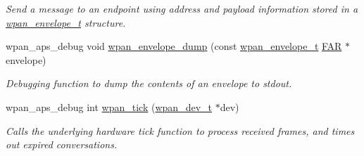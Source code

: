 \begin{DoxyCompactItemize}
\begin{DoxyCompactList}\small\item\em Send a message to an endpoint using address and payload information stored in a \hyperlink{structwpan__envelope__t}{wpan\+\_\+envelope\+\_\+t} structure. \end{DoxyCompactList}\item 
wpan\+\_\+aps\+\_\+debug void \hyperlink{group__wpan__aps_ga2a4e8b3e2022e55e6607243a5feb25cd}{wpan\+\_\+envelope\+\_\+dump} (const \hyperlink{structwpan__envelope__t}{wpan\+\_\+envelope\+\_\+t} \hyperlink{group__hal_gaef060b3456fdcc093a7210a762d5f2ed}{F\+AR} $\ast$envelope)
\begin{DoxyCompactList}\small\item\em Debugging function to dump the contents of an envelope to stdout. \end{DoxyCompactList}\item 
wpan\+\_\+aps\+\_\+debug int \hyperlink{group__wpan__aps_ga1254464011d2d98c13db7b0b3d41c25b}{wpan\+\_\+tick} (\hyperlink{structwpan__dev__t}{wpan\+\_\+dev\+\_\+t} $\ast$dev)
\begin{DoxyCompactList}\small\item\em Calls the underlying hardware tick function to process received frames, and times out expired conversations. \end{DoxyCompactList}\end{DoxyCompactItemize}
